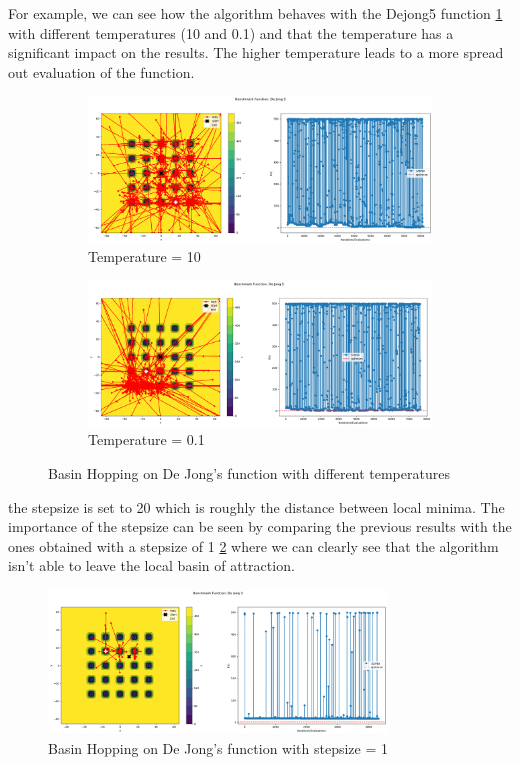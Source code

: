 For example, we can see how the algorithm behaves with the Dejong5 function \ref{fig:bh-dejong} with different temperatures (10 and 0.1) and that the temperature has a significant impact on the results. The higher temperature leads to a more spread out evaluation of the function.
\begin{figure}[H]
    \begin{subfigure}{0.5\textwidth}
        \includegraphics[width=\textwidth]{lab2/imgs/bh_dejong_10.png}
        \caption{Temperature = 10}
    \end{subfigure}
    \begin{subfigure}{0.5\textwidth}
        \includegraphics[width=\textwidth]{lab2/imgs/bh_dejong_01.png}
        \caption{Temperature = 0.1}
    \end{subfigure}
    \caption{Basin Hopping on De Jong's function with different temperatures}
    \label{fig:bh-dejong}
\end{figure}
the stepsize is set to 20 which is roughly the distance between local minima. The importance of the stepsize can be seen by comparing the previous results with the ones obtained with a stepsize of 1 \ref{fig:bh-dejong-stepsize} where we can clearly see that the algorithm isn't able to leave the local basin of attraction.
\begin{figure}[H]
    \centering
    \includegraphics[width=0.8\textwidth]{lab2/imgs/bh_dejong_step_1.png}
    \caption{Basin Hopping on De Jong's function with stepsize = 1}
    \label{fig:bh-dejong-stepsize}
\end{figure}

